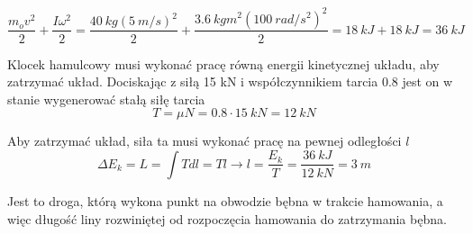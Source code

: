     \begin{equation}
        \frac{m_o v^2}{2} + \frac{I \omega^2}{2} = \frac{\SI{40}{kg}(\SI{5}{m/s})^2}{2} + \frac{\SI{3.6}{kg m^2} (\SI{100}{rad/s^2})^2}{2} = \SI{18}{kJ} + \SI{18}{kJ} = \SI{36}{kJ}
    \end{equation}{}
    
    Klocek hamulcowy musi wykonać pracę równą energii kinetycznej układu, aby zatrzymać układ. Dociskając z siłą 15 kN i współczynnikiem tarcia 0.8 jest on w stanie wygenerować stałą siłę tarcia
    \begin{equation}
        T = \mu N = 0.8 \cdot \SI{15}{kN} = \SI{12}{kN}
    \end{equation}{}
    
    Aby zatrzymać układ, siła ta musi wykonać pracę na pewnej odległości $l$
    \begin{equation}
        \Delta E_k = L = \int T dl = Tl \xrightarrow{} l = \frac{E_k}{T} = \frac{\SI{36}{kJ}}{\SI{12}{kN}} = \SI{3}{m}
    \end{equation}{}
    
    Jest to droga, którą wykona punkt na obwodzie bębna w trakcie hamowania, a więc długość liny rozwiniętej od rozpoczęcia hamowania do zatrzymania bębna.